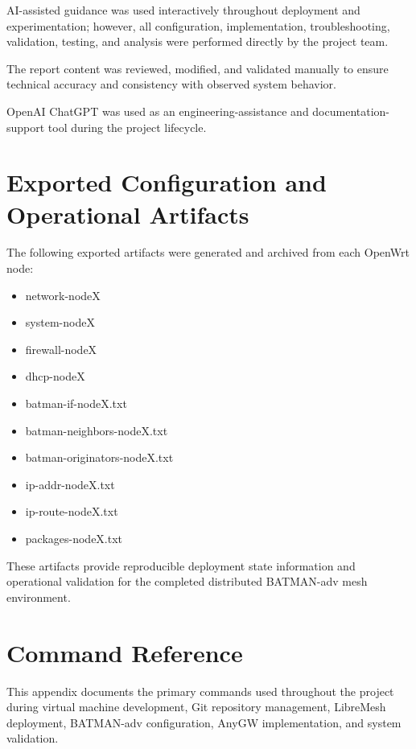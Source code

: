 \documentclass[conference]{IEEEtran}
\begin{document}
AI-assisted guidance was used interactively throughout deployment and experimentation; however, all configuration, implementation, troubleshooting, validation, testing, and analysis were performed directly by the project team.

The report content was reviewed, modified, and validated manually to ensure technical accuracy and consistency with observed system behavior.

OpenAI ChatGPT was used as an engineering-assistance and documentation-support tool during the project lifecycle.

\appendices

\section{Exported Configuration and Operational Artifacts}

The following exported artifacts were generated and archived from each OpenWrt node:

\begin{itemize}
    \item network-nodeX
    \item system-nodeX
    \item firewall-nodeX
    \item dhcp-nodeX
    \item batman-if-nodeX.txt
    \item batman-neighbors-nodeX.txt
    \item batman-originators-nodeX.txt
    \item ip-addr-nodeX.txt
    \item ip-route-nodeX.txt
    \item packages-nodeX.txt
\end{itemize}

These artifacts provide reproducible deployment state information and operational validation for the completed distributed BATMAN-adv mesh environment.

\appendix

\section{Command Reference}

This appendix documents the primary commands used throughout the project during virtual machine development, Git repository management, LibreMesh deployment, BATMAN-adv configuration, AnyGW implementation, and system validation.
\end{document}
